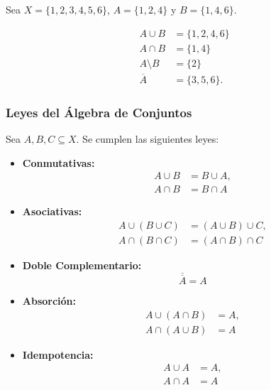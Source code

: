 \documentclass[a4paper,12pt]{article}
\begin{document}
\begin{ejemplo}
Sea \( X = \{1,2,3,4,5,6\} \), \( A = \{1,2,4\} \) y \( B = \{1,4,6\} \).

\[
\begin{aligned}
A \cup B &= \{1,2,4,6\}\\
A \cap B &= \{1,4\}\\
A \setminus B &= \{2\} \\
\overline{A} &= \{3,5,6\}.
\end{aligned}
\]
\end{ejemplo}

\subsubsection{Leyes del Álgebra de Conjuntos}

\begin{procedimiento}[title=Lista de Leyes]

Sea \(A, B, C \subseteq X\). Se cumplen las siguientes leyes:

\begin{itemize}
    \item \textbf{Conmutativas:}
    \[
    \begin{aligned}
    A \cup B &= B \cup A,\\
    A \cap B &= B \cap A
    \end{aligned}
    \]
    
    \item \textbf{Asociativas:}
    \[
    \begin{aligned}
    A \cup (B \cup C) &= (A \cup B) \cup C,\\
    A \cap (B \cap C) &= (A \cap B) \cap C
    \end{aligned}
    \]
    
    \item \textbf{Doble Complementario:}
    \[
    \overline{\overline{A}} = A
    \]
    
    \item \textbf{Absorción:}
    \[
    \begin{aligned}
    A \cup (A \cap B) &= A,\\
    A \cap (A \cup B) &= A
    \end{aligned}
    \]
    
    \item \textbf{Idempotencia:}
    \[
    \begin{aligned}
    A \cup A &= A,\\
    A \cap A &= A
    \end{aligned}
    \]
    

\end{itemize}
\end{procedimiento}
\end{document}
